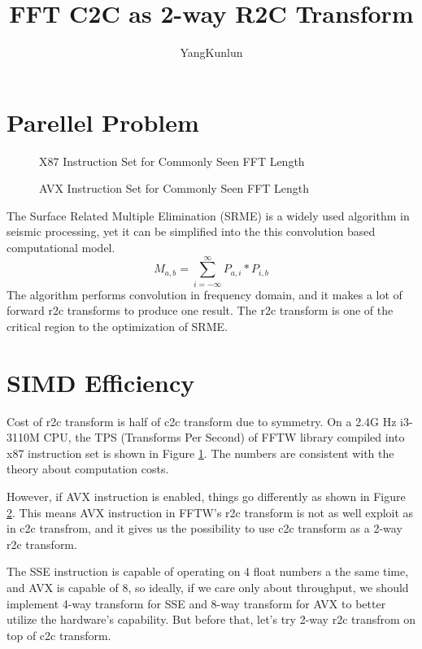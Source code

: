 \documentclass[a4paper,12pt]{article}
\title{FFT C2C as 2-way R2C Transform}
\author{YangKunlun}
\begin{document}
\maketitle
\section{Parellel Problem}
\begin{figure}
\begin{center}  \end{center}
    \caption{X87 Instruction Set for Commonly Seen FFT Length} \label{fig:x87}
\end{figure}
\begin{figure}
\begin{center}  \end{center}
    \caption{AVX Instruction Set for Commonly Seen FFT Length} \label{fig:avx}
\end{figure}
The Surface Related Multiple Elimination (SRME) is a widely used algorithm in seismic processing,
yet it can be simplified into the this convolution based computational model.
\begin{equation}
    M_{a,b} = \sum_{i=-\infty}^{\infty}P_{a,i}\ast P_{i,b}
\end{equation}
The algorithm performs convolution in frequency domain, 
and it makes a lot of forward r2c transforms to produce one result.
The r2c transform is one of the critical region to the optimization of SRME.
\section{SIMD Efficiency}
Cost of r2c transform is half of c2c transform due to symmetry.
On a 2.4G Hz i3-3110M CPU, the TPS (Transforms Per Second) of FFTW library compiled into x87 instruction set 
is shown in Figure \ref{fig:x87}.
The numbers are consistent with the theory about computation costs. 
\par
However, if AVX instruction is enabled, things go differently as shown in Figure \ref{fig:avx}.
This means AVX instruction in FFTW's r2c transform is not as well exploit as in c2c transfrom,
and it gives us the possibility to use c2c transform as a 2-way r2c transform.
\par
The SSE instruction is capable of operating on 4 float numbers a the same time, and AVX is capable of 8,
so ideally, if we care only about throughput,
we should implement 4-way transform for SSE and 8-way transform for AVX to better utilize the hardware's capability.
But before that, let's try 2-way r2c transfrom on top of c2c transform.
\end{document}
